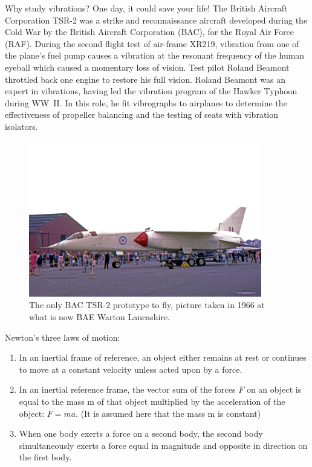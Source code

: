 \documentclass[12pt,letter]{article}
\begin{document}
	\begin{vibration_case_study}
		Why study vibrations? One day, it could save your life! The British Aircraft Corporation TSR-2 was a strike and reconnaissance aircraft developed during the Cold War by the British Aircraft Corporation (BAC), for the Royal Air Force (RAF). During the second flight test of air-frame XR219, vibration from one of the plane's fuel pump causes a vibration at the resonant frequency of the human eyeball which caused a momentary loss of vision. Test pilot Roland Beamont throttled back one engine to restore his full vision. Roland Beamont was an expert in vibrations, having led the vibration program of the Hawker Typhoon during WW~II. In this role, he fit vibrographs to airplanes to determine the effectiveness of propeller balancing and the testing of seats with vibration isolators. 

		\begin{figure}[H]
			\centering
			\includegraphics[width=4in]{../figures/TSR_2.jpg}
			\caption{The only BAC TSR-2 prototype to fly, picture taken in 1966 at what is now BAE Warton Lancashire.\protect\footnotemark[1]}
		\end{figure}
	\end{vibration_case_study}

	\begin{review}
		Newton's three laws of motion:
		\begin{enumerate}
			\item In an inertial frame of reference, an object either remains at rest or continues to move at a constant velocity unless acted upon by a force.
			\item In an inertial reference frame, the vector sum of the forces $F$ on an object is equal to the mass m of that object multiplied by the acceleration of the object: $F = ma$. (It is assumed here that the mass m is constant)
			\item When one body exerts a force on a second body, the second body simultaneously exerts a force equal in magnitude and opposite in direction on the first body.
		\end{enumerate}
	\end{review}
\end{document}

